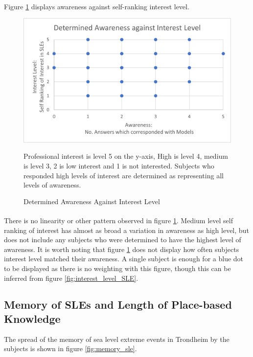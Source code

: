 \paragraph{}
Figure \ref{fig:aware_vs_interest} displays awareness against self-ranking interest level.

\begin{figure}[H]
    \centering
    \includegraphics{fig_results/aware_vs_interest.png}
    \caption{Determined Awareness Against Interest Level}{ Professional interest is level 5 on the y-axis, High  is level 4, medium is level 3, 2 is low interest and 1 is not interested. Subjects who responded high levels of interest are determined as representing all levels of awareness.  }
    \label{fig:aware_vs_interest}
\end{figure}
\paragraph{}

There is no linearity or other pattern observed in figure \ref{fig:aware_vs_interest}. Medium level self ranking of interest has almost as broad a variation in awareness as high level, but does not include any subjects who were determined to have the highest level of awareness.  It is worth noting  that figure \ref{fig:aware_vs_interest} does not display how often subjects interest level matched their awareness. A single subject is enough for a blue dot to be displayed as there is no weighting with this figure, though this can be inferred from figure \ref{fig:interest_level_SLE}. 


\subsection{Memory of SLEs and Length of Place-based Knowledge}
The spread of the memory of sea level extreme events in Trondheim by the subjects is shown in figure \ref{fig:memory_sle}.

